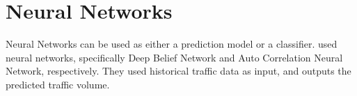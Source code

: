 




\section{Neural Networks}
Neural Networks can be used as either a prediction model or a classifier.  used neural networks, specifically Deep Belief Network and Auto Correlation Neural Network, respectively. They used historical traffic data as input, and outputs the predicted traffic volume. 

